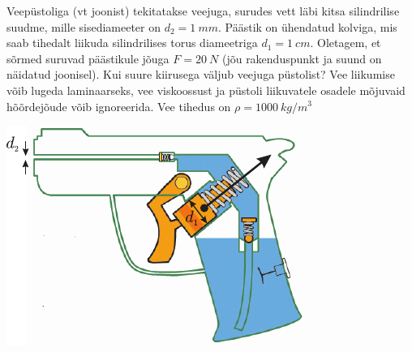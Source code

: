 \documentclass[10pt, twoside]{article}
\begin{document}
{%

Veepüstoliga (vt joonist) tekitatakse veejuga, surudes vett läbi kitsa silindrilise suudme, mille sisediameeter on $d_2 = \SI{1}{mm}$. Päästik on ühendatud kolviga, mis saab tihedalt liikuda silindrilises torus diameetriga $d_1 = \SI{1}{cm}$. Oletagem, et sõrmed suruvad päästikule jõuga $F = \SI{20}{N}$ (jõu rakenduspunkt ja suund on näidatud joonisel). Kui suure kiirusega väljub veejuga püstolist? Vee liikumise võib lugeda laminaarseks, vee viskoossust ja püstoli liikuvatele osadele mõjuvaid hõõrdejõude võib ignoreerida. Vee tihedus on $\rho = \SI{1000}{kg/m^3}$

\begin{center}
	\includegraphics[width=0.6\linewidth]{2006-v3g-04-yl}
\end{center}
\probend
\bigskip


}
\end{document}
